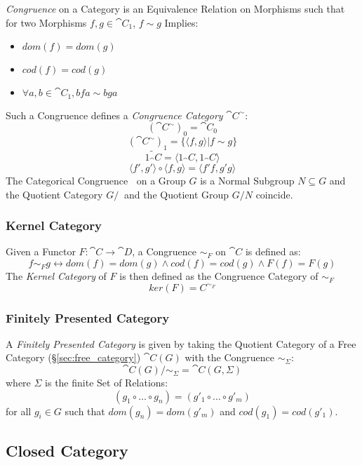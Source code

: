 \emph{Congruence} on a Category is an Equivalence Relation on
Morphisms such that for two Morphisms $f,g \in \cat{C_1}$, $f \sim
g$ Implies:
\begin{itemize}
  \item $dom(f) = dom(g)$
  \item $cod(f) = cod(g)$
  \item $\forall a,b \in \cat{C_1}, bfa \sim bga$
\end{itemize}
Such a Congruence defines a \emph{Congruence Category}
$\cat{C^{\sim}}$:
\[
  (\cat{C^{\sim}})_0 = \cat{C}_0
\]\[
  (\cat{C^{\sim}})_1 = \{\langle f,g \rangle | f \sim g\}
\]\[
  \tilde{1_\cat{C}} = \langle 1_\cat{C}, 1_\cat{C} \rangle
\]\[
  \langle f',g' \rangle \circ \langle f,g \rangle = \langle f'f,g'g \rangle
\]
The Categorical Congruence $~$ on a Group $G$ is a Normal Subgroup $N
\subseteq G$ and the Quotient Category $G/~$ and the Quotient Group
$G/N$ coincide. \cite{awodey06}



\subsubsection{Kernel Category}\label{sec:kernel_category}

Given a Functor $F : \cat{C} \rightarrow \cat{D}$, a Congruence
$\sim_F$ on $\cat{C}$ is defined as:
\[
  f \sim_F g \leftrightarrow dom(f) = dom(g) \wedge cod(f) = cod(g)
  \wedge F(f) = F(g)
\]
The \emph{Kernel Category} of $F$ is then defined as the Congruence
Category of $\sim_F$
\[
  ker(F) = C^{\sim_F}
\]



\subsubsection{Finitely Presented Category}
\label{sec:finitely_presented}

A \emph{Finitely Presented Category} is given by taking the Quotient
Category of a Free Category (\S\ref{sec:free_category})
$\cat{C}(G)$ with the Congruence $\sim_\Sigma$:
\[
  \cat{C}(G) / \sim_{\Sigma} = \cat{C}(G,\Sigma)
\]
where $\Sigma$ is the finite Set of Relations:
\[
  (g_1 \circ \ldots \circ g_n) = (g'_1 \circ \ldots \circ g'_m)
\]
for all $g_i \in G$ such that $dom(g_n) = dom(g'_m)$ and $cod(g_1) =
cod(g'_1)$.



\subsection{Closed Category}\label{sec:closed_category}

